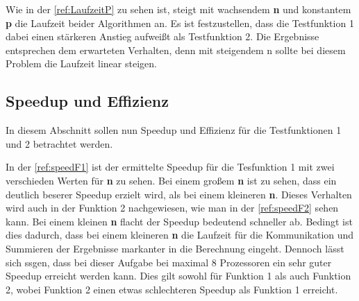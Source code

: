 Wie in der \autoref{ref:LaufzeitP} zu sehen ist, steigt mit wachsendem \textbf{n} und konstantem \textbf{p} die Laufzeit beider Algorithmen an.
Es ist festzustellen, dass die Testfunktion 1 dabei einen stärkeren Anstieg aufweißt als Testfunktion 2.
Die Ergebnisse entsprechen dem erwarteten Verhalten, denn mit steigendem n sollte bei diesem Problem die Laufzeit linear steigen.

\subsection{Speedup und Effizienz}
In diesem Abschnitt sollen nun Speedup und Effizienz für die Testfunktionen 1 und 2 betrachtet werden.

In der \autoref{ref:speedF1} ist der ermittelte Speedup für die Tesfunktion 1 mit zwei verschieden Werten für \textbf{n} zu sehen.
Bei einem großem \textbf{n} ist zu sehen, dass ein deutlich beserer Speedup erzielt wird, als bei einem kleineren \textbf{n}.
Dieses Verhalten wird auch in der Funktion 2 nachgewiesen, wie man in der \autoref{ref:speedF2} sehen kann.
Bei einem kleinen \textbf{n} flacht der Speedup bedeutend schneller ab.
Bedingt ist dies dadurch, dass bei einem kleineren \textbf{n} die Laufzeit für die Kommunikation und Summieren der Ergebnisse markanter in die Berechnung eingeht.
Dennoch lässt sich ssgen, dass bei dieser Aufgabe bei maximal 8 Prozessoren ein sehr guter Speedup erreicht werden kann.
Dies gilt sowohl für Funktion 1 als auch Funktion 2, wobei Funktion 2 einen etwas schlechteren Speedup als Funktion 1 erreicht.
